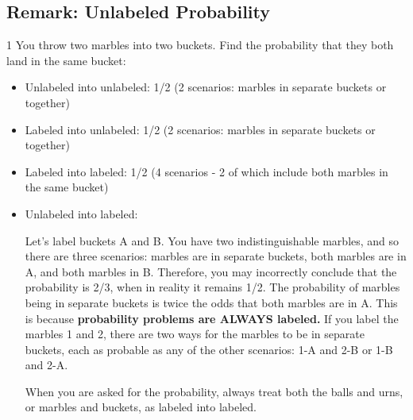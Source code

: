 \label{21-0321-1}
\subsection{Remark: Unlabeled Probability}

\begin{problem}
1 You throw two marbles into two buckets. Find the probability that they both land in the same bucket: 

\begin{itemize}
    \item Unlabeled into unlabeled:  1/2 (2 scenarios: marbles in separate buckets or together)
    \item Labeled into unlabeled: 1/2 (2 scenarios: marbles in separate buckets or together)
    \item Labeled into labeled: 1/2 (4 scenarios - 2 of which include both marbles in the same bucket)
    
    \item Unlabeled into labeled: 
    
    Let's label buckets A and B. You have two indistinguishable marbles, and so there are three scenarios: marbles are in separate buckets, both marbles are in A, and both marbles in B. Therefore, you may incorrectly conclude that the probability is 2/3, when in reality it remains 1/2. The probability of marbles being in separate buckets is twice the odds that both marbles are in A. 
    \newline \newline
    This is because \textbf{probability problems are ALWAYS labeled.}
    \newline \newline
    If you label the marbles 1 and 2, there are two ways for the marbles to be in separate buckets, each as probable as any of the other scenarios: 1-A and 2-B or 1-B and 2-A. 
    
    When you are asked for the probability, always treat both the balls and urns, or marbles and buckets, as labeled into labeled. 

\end{itemize}

\end{problem}